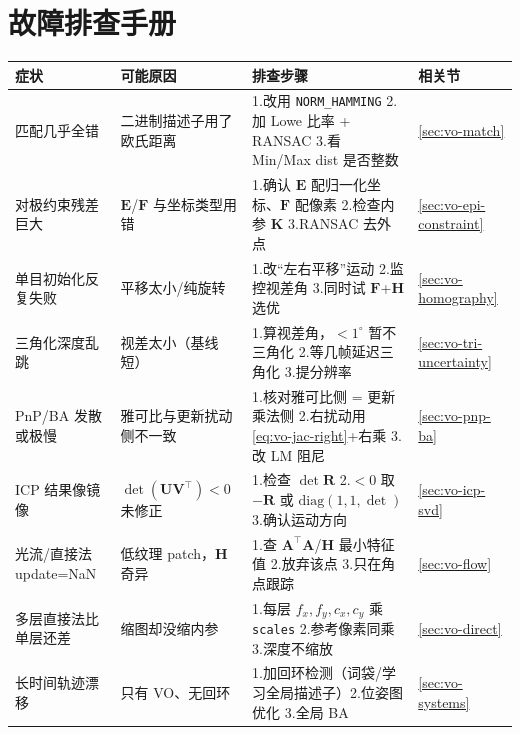 \section*{故障排查手册}
\begin{table}[H]\centering\small
\begin{tabular}{p{}p{}p{}p{}}
\toprule
症状 & 可能原因 & 排查步骤 & 相关节 \\
\midrule
匹配几乎全错 & 二进制描述子用了欧氏距离 & 1.改用 \texttt{NORM\_HAMMING} 2.加 Lowe 比率 + RANSAC 3.看 Min/Max dist 是否整数 & \cref{sec:vo-match} \\
对极约束残差巨大 & $\mathbf{E}$/$\mathbf{F}$ 与坐标类型用错 & 1.确认 $\mathbf{E}$ 配归一化坐标、$\mathbf{F}$ 配像素 2.检查内参 $\mathbf{K}$ 3.RANSAC 去外点 & \cref{sec:vo-epi-constraint} \\
单目初始化反复失败 & 平移太小/纯旋转 & 1.改“左右平移”运动 2.监控视差角 3.同时试 $\mathbf{F}$+$\mathbf{H}$ 选优 & \cref{sec:vo-homography} \\
三角化深度乱跳 & 视差太小（基线短） & 1.算视差角，$<1^\circ$ 暂不三角化 2.等几帧延迟三角化 3.提分辨率 & \cref{sec:vo-tri-uncertainty} \\
PnP/BA 发散或极慢 & 雅可比与更新扰动侧不一致 & 1.核对雅可比侧 = 更新乘法侧 2.右扰动用 \cref{eq:vo-jac-right}+右乘 3.改 LM 阻尼 & \cref{sec:vo-pnp-ba} \\
ICP 结果像镜像 & $\det(\mathbf{U}\mathbf{V}^\top)<0$ 未修正 & 1.检查 $\det\mathbf{R}$ 2.$<0$ 取 $-\mathbf{R}$ 或 $\mathrm{diag}(1,1,\det)$ 3.确认运动方向 & \cref{sec:vo-icp-svd} \\
光流/直接法 update=NaN & 低纹理 patch，$\mathbf{H}$ 奇异 & 1.查 $\mathbf{A}^\top\mathbf{A}$/$\mathbf{H}$ 最小特征值 2.放弃该点 3.只在角点跟踪 & \cref{sec:vo-flow} \\
多层直接法比单层还差 & 缩图却没缩内参 & 1.每层 $f_x,f_y,c_x,c_y$ 乘 \texttt{scales} 2.参考像素同乘 3.深度不缩放 & \cref{sec:vo-direct} \\
长时间轨迹漂移 & 只有 VO、无回环 & 1.加回环检测（词袋/学习全局描述子）2.位姿图优化 3.全局 BA & \cref{sec:vo-systems} \\
\bottomrule
\end{tabular}
\end{table}

